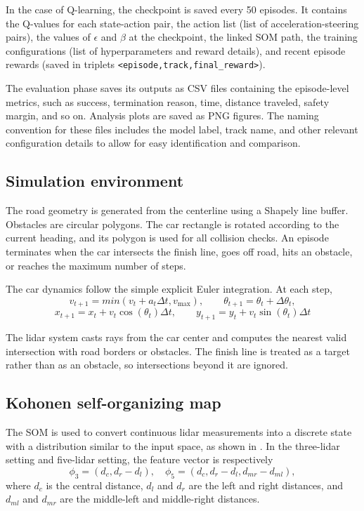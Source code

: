In the case of Q-learning, the checkpoint is saved every 50 episodes. It contains the Q-values for each state-action pair, the action list (list of acceleration-steering pairs), the values of $\epsilon$ and $\beta$ at the checkpoint, the linked SOM path, the training configurations (list of hyperparameters and reward details), and recent episode rewards (saved in triplets \texttt{<episode,track,final\_reward>}).

The evaluation phase saves its outputs as CSV files containing the episode-level metrics, such as success, termination reason, time, distance traveled, safety margin, and so on. Analysis plots are saved as PNG figures. The naming convention for these files includes the model label, track name, and other relevant configuration details to allow for easy identification and comparison.

\subsection{Simulation environment}

The road geometry is generated from the centerline using a Shapely line buffer. Obstacles are circular polygons. The car rectangle is rotated according to the current heading, and its polygon is used for all collision checks. An episode terminates when the car intersects the finish line, goes off road, hits an obstacle, or reaches the maximum number of steps.

The car dynamics follow the simple explicit Euler integration. At each step,
\[
    v_{t+1} = min(v_t + a_t \Delta t, v_{\max}), \qquad
    \theta_{t+1} = \theta_t + \Delta \theta_t,
\]
\[
    x_{t+1} = x_t + v_{t}\cos(\theta_{t})\Delta t, \qquad
    y_{t+1} = y_t + v_{t}\sin(\theta_{t})\Delta t
\]

The lidar system casts rays from the car center and computes the nearest valid intersection with road borders or obstacles. The finish line is treated as a target rather than as an obstacle, so intersections beyond it are ignored.

\subsection{Kohonen self-organizing map}

The SOM is used to convert continuous lidar measurements into a discrete state with a distribution similar to the input space, as shown in . In the three-lidar setting and five-lidar setting, the feature vector is respectively
\[
    \phi_3 = (d_c, d_r - d_l), \quad \phi_5 = (d_c, d_r - d_l, d_{mr} - d_{ml}),
\]
where $d_c$ is the central distance, $d_l$ and $d_r$ are the left and right distances, and $d_{ml}$ and $d_{mr}$ are the middle-left and middle-right distances.

